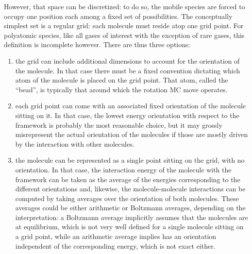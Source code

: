 \documentclass[main.tex]{subfiles}
\begin{document}
However, that space can be discretized: to do so, the mobile species are forced to occupy one position each among a fixed set of possibilities. The conceptually simplest set is a regular grid: each molecule must reside atop one grid point. For polyatomic species, like all gases of interest with the exception of rare gases, this definition is incomplete however. There are thus three options: 
\begin{enumerate}
	\item the grid can include additional dimensions to account for the orientation of the molecule. In that case there must be a fixed convention dictating which atom of the molecule is placed on the grid point. That atom, called the ``bead'', is typically that around which the rotation MC move operates.
	\item each grid point can come with an associated fixed orientation of the molecule sitting on it. In that case, the lowest energy orientation with respect to the framework is probably the most reasonable choice, but it may grossly misrepresent the actual orientation of the molecules if those are mostly driven by the interaction with other molecules.
	\item the molecule can be represented as a single point sitting on the grid, with no orientation. In that case, the interaction energy of the molecule with the framework can be taken as the average of the energies corresponding to the different orientations and, likewise, the molecule-molecule interactions can be computed by taking averages over the orientation of both molecules. These averages could be either arithmetic or Boltzmann averages, depending on the interpretation: a Boltzmann average implicitly assumes that the molecules are at equilibrium, which is not very well defined for a single molecule sitting on a grid point, while an arithmetic average implies has an orientation independent of the corresponding energy, which is not exact either.
\end{enumerate}
\end{document}
